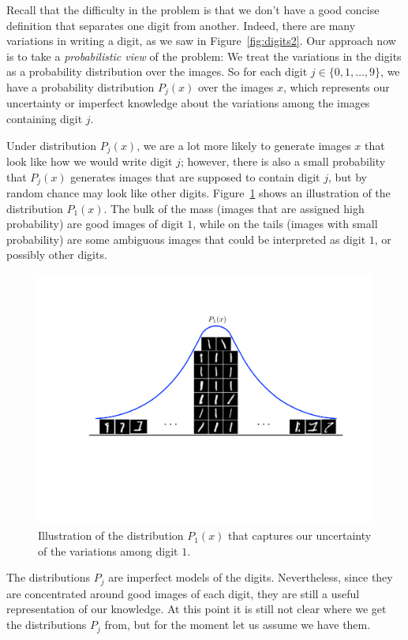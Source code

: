 \documentclass[11pt]{article}
\begin{document}
Recall that the difficulty in the problem is that we don't have a good concise definition that separates one digit from another. Indeed, there are many variations in writing a digit, as we saw in Figure~\ref{fig:digits2}. Our approach now is to take a {\em probabilistic view} of the problem: We treat the variations in the digits as a probability distribution over the images. So for each digit $j \in \{0,1,\dots,9\}$, we have a probability distribution $P_j(x)$ over the images $x$, which represents our uncertainty or imperfect knowledge about the variations among the images containing digit $j$.

Under distribution $P_j(x)$, we are a lot more likely to generate images $x$ that look like how we would write digit $j$; however, there is also a small probability that $P_j(x)$ generates images that are supposed to contain digit $j$, but by random chance may look like other digits. Figure~\ref{fig:P1x} shows an illustration of the distribution $P_1(x)$. The bulk of the mass (images that are assigned high probability) are good images of digit $1$, while on the tails (images with small probability) are some ambiguous images that could be interpreted as digit $1$, or possibly other digits.

\begin{figure}[h!]
\centering
\includegraphics[scale=0.32]{P1x}
\caption{Illustration of the distribution $P_1(x)$ that captures our uncertainty of the variations among digit $1$.}
\label{fig:P1x}
\end{figure}

The distributions $P_j$ are imperfect models of the digits. Nevertheless, since they are concentrated around good images of each digit, they are still a useful representation of our knowledge. At this point it is still not clear where we get the distributions $P_j$ from, but for the moment let us assume we have them.
\end{document}
